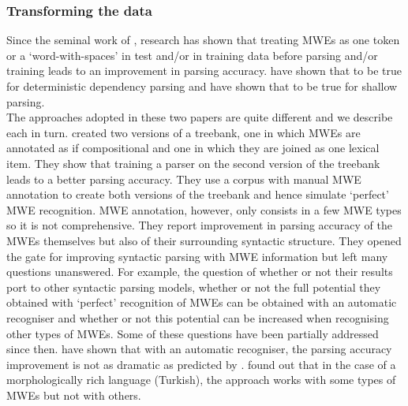 \documentclass[output=paper]{LSP/langsci}
\begin{document}
                        \subsubsection{Transforming the data}
                        \label{changingdata}
                        \indent Since the seminal work of \citet{nivre2004multiword}, research has shown that treating MWEs as one token or a `word-with-spaces' in test and/or in training data before parsing and/or training leads to an improvement in parsing accuracy. \citet{nivre2004multiword} have shown that to be true for deterministic dependency parsing and \citet{korkontzelosetal2010} have shown that to be true for shallow parsing. \\
                        \indent The approaches adopted in these two papers are quite different and we describe each in turn.
                        \indent \citet{nivre2004multiword} created two versions of a treebank, one in which MWEs are annotated as if compositional and one in which they are joined as one lexical item. They show that training a parser on the second version of the treebank leads to a better parsing accuracy. They use a corpus with manual MWE annotation to create both versions of the treebank and hence simulate `perfect' MWE recognition. MWE annotation, however, only consists in a few MWE types so it is not comprehensive. They report improvement in parsing accuracy of the MWEs themselves but also of their surrounding syntactic structure. They opened the gate for improving syntactic parsing with MWE information but left many questions unanswered. For example, the question of whether or not their results port to other syntactic parsing models, whether or not the full potential they obtained with `perfect' recognition of MWEs can be obtained with an automatic recogniser and whether or not this potential can be increased when recognising other types of MWEs. Some of these questions have been partially addressed since then. \citet{constant2012} have shown that with an automatic recogniser, the parsing accuracy improvement is not as dramatic as predicted by \citet{nivre2004multiword}. \citet{eryiugit2011multiword} found out that in the case of a morphologically rich language (Turkish), the approach works with some types of MWEs but not with others.
                        \label{korkontz}
\end{document}
